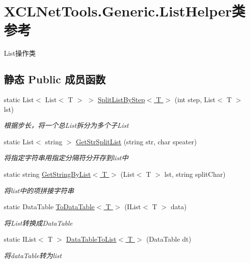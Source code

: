 \hypertarget{class_x_c_l_net_tools_1_1_generic_1_1_list_helper}{\section{X\-C\-L\-Net\-Tools.\-Generic.\-List\-Helper类 参考}
\label{class_x_c_l_net_tools_1_1_generic_1_1_list_helper}
}


List操作类  


\subsection*{静态 Public 成员函数}
\begin{DoxyCompactItemize}
\item 
static List$<$ List$<$ T $>$ $>$ \hyperlink{class_x_c_l_net_tools_1_1_generic_1_1_list_helper_a38adb871b8752fb797795645625b7b4f}{Split\-List\-By\-Step$<$ T $>$} (int step, List$<$ T $>$ lst)
\begin{DoxyCompactList}\small\item\em 根据步长，将一个总\-List拆分为多个子\-List \end{DoxyCompactList}\item 
static List$<$ string $>$ \hyperlink{class_x_c_l_net_tools_1_1_generic_1_1_list_helper_a3225ddcbde7d47ccef1ab295ebbd2f1d}{Get\-Str\-Split\-List} (string str, char speater)
\begin{DoxyCompactList}\small\item\em 将指定字符串用指定分隔符分开存到list中 \end{DoxyCompactList}\item 
static string \hyperlink{class_x_c_l_net_tools_1_1_generic_1_1_list_helper_a02b07a0f7a7d4506c358650ba010f7d9}{Get\-String\-By\-List$<$ T $>$} (List$<$ T $>$ lst, string split\-Char)
\begin{DoxyCompactList}\small\item\em 将list中的项拼接字符串 \end{DoxyCompactList}\item 
static Data\-Table \hyperlink{class_x_c_l_net_tools_1_1_generic_1_1_list_helper_aabb9427ae92df2eb55b7ea300be149a9}{To\-Data\-Table$<$ T $>$} (I\-List$<$ T $>$ data)
\begin{DoxyCompactList}\small\item\em 将\-List转换成\-Data\-Table \end{DoxyCompactList}\item 
static I\-List$<$ T $>$ \hyperlink{class_x_c_l_net_tools_1_1_generic_1_1_list_helper_aa1d5d2843b5a105edf4eb8c160fcd016}{Data\-Table\-To\-List$<$ T $>$} (Data\-Table dt)
\begin{DoxyCompactList}\small\item\em 将data\-Table转为list \end{DoxyCompactList}\end{DoxyCompactItemize}


